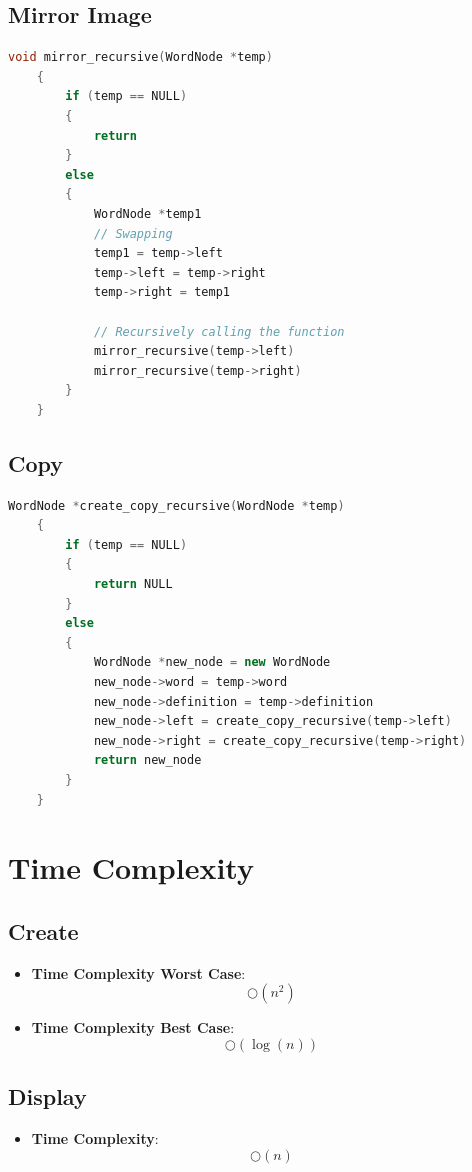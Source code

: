 \documentclass[11pt]{article}
\begin{document}
\subsection{Mirror Image}
\begin{lstlisting}[language=C++]
    void mirror_recursive(WordNode *temp)
    {
        if (temp == NULL)
        {
            return
        }
        else
        {
            WordNode *temp1
            // Swapping
            temp1 = temp->left
            temp->left = temp->right
            temp->right = temp1

            // Recursively calling the function
            mirror_recursive(temp->left)
            mirror_recursive(temp->right)
        }
    }
\end{lstlisting}
\subsection{Copy}
\begin{lstlisting}[language=C++]
    WordNode *create_copy_recursive(WordNode *temp)
    {
        if (temp == NULL)
        {
            return NULL
        }
        else
        {
            WordNode *new_node = new WordNode
            new_node->word = temp->word
            new_node->definition = temp->definition
            new_node->left = create_copy_recursive(temp->left)
            new_node->right = create_copy_recursive(temp->right)
            return new_node
        }
    }
\end{lstlisting}

\section{Time Complexity}
\subsection{Create}
\begin{itemize}
	\item \textbf{Time Complexity Worst Case}: \[\bigcirc(n^2)\]
	\item \textbf{Time Complexity Best Case}: \[\bigcirc(\log(n))\]
\end{itemize}
\subsection{Display}
\begin{itemize}
	\item \textbf{Time Complexity}: \[\bigcirc(n)\]
\end{itemize}
\end{document}
